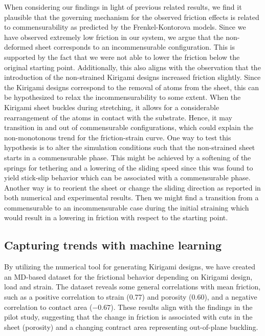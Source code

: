 When considering our findings in light of previous related results, we find it
plausible that the governing mechanism for the observed friction effects is
related to commensurability as predicted by the Frenkel-Kontorova models. Since we have observed extremely low friction in
our system, we argue that the non-deformed sheet corresponds to an
incommensurable configuration. This is supported by the fact that we were not
able to lower the friction below the original starting point. Additionally, this
also aligns with the observation that the introduction of the non-strained
Kirigami designs increased friction slightly. Since the Kirigami designs correspond to the removal of atoms from the sheet, this can be hypothesized to relax the incommensurability to some extent. When the Kirigami sheet buckles during stretching, it allows for a
considerable rearrangement of the atoms in contact with the substrate. Hence, it
may transition in and out of commensurable configurations, which could explain
the non-monotonous trend for the friction-strain curve. One way to test this hypothesis is to alter the simulation conditions such that the non-strained sheet starts in a commensurable phase. This might be achieved by a softening of the springs for tethering and a lowering of the sliding speed since this was found to yield stick-slip behavior which can be associated with a commensurable phase.  Another way is to reorient the sheet or change the sliding direction as reported in both numerical and experimental results. Then we might find a transition from a commensurable to an
incommensurable case during the initial straining which would result in a
lowering in friction with respect to the starting point. 



\subsection{Capturing trends with machine learning}
By utilizing the numerical tool for generating Kirigami designs, we have
created an \acrshort{MD}-based dataset for the frictional behavior depending on
Kirigami design, load and strain. The dataset reveals some general correlations
with mean friction, such as a positive correlation to strain (0.77) and porosity
(0.60), and a negative correlation to contact area ($-0.67$). These results
align with the findings in the pilot study, suggesting that the change in
friction is associated with cuts in the sheet (porosity) and a changing contract area representing out-of-plane buckling. 

